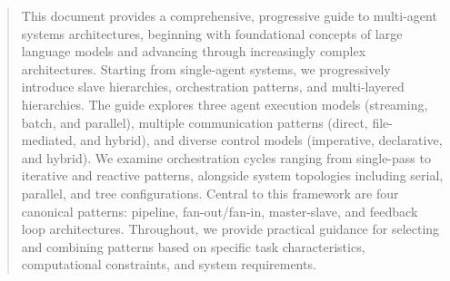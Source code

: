\begin{abstract}
\noindent
This document provides a comprehensive, progressive guide to multi-agent systems architectures, beginning with foundational concepts of large language models and advancing through increasingly complex architectures. Starting from single-agent systems, we progressively introduce slave hierarchies, orchestration patterns, and multi-layered hierarchies. The guide explores three agent execution models (streaming, batch, and parallel), multiple communication patterns (direct, file-mediated, and hybrid), and diverse control models (imperative, declarative, and hybrid). We examine orchestration cycles ranging from single-pass to iterative and reactive patterns, alongside system topologies including serial, parallel, and tree configurations. Central to this framework are four canonical patterns: pipeline, fan-out/fan-in, master-slave, and feedback loop architectures. Throughout, we provide practical guidance for selecting and combining patterns based on specific task characteristics, computational constraints, and system requirements.
\end{abstract}

